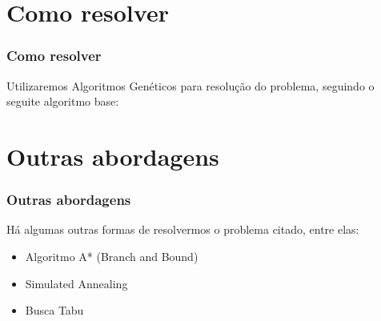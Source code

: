 \documentclass[12pt]{beamer}
\begin{document}
\section{Como resolver} 
\begin{frame} 
        \frametitle{Como resolver}
        \begin{block}{Utilizaremos Algoritmos Genéticos para resolução do problema, seguindo o seguite algoritmo base:}
	\end{block}
\end{frame}

\section{Outras abordagens} 
\begin{frame} 
        \frametitle{Outras abordagens}
        \begin{block}{Há algumas outras formas de resolvermos o problema citado, entre elas:}
                \begin{itemize}
                        \item Algoritmo A* (Branch and Bound)    \pause
                        \item Simulated Annealing   \pause
                        \item Busca Tabu  \pause
                \end{itemize}
        \end{block}
\end{frame}
              
\end{document}

